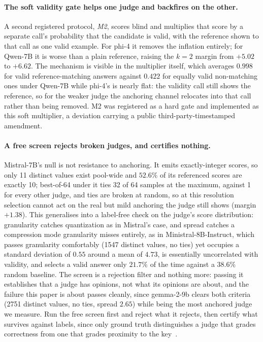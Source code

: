 \documentclass[11pt]{article}
\begin{document}
\paragraph{The soft validity gate helps one judge and backfires on the other.}
A second registered protocol, \emph{M2}, scores blind and multiplies that score by a separate call's probability that the candidate is valid, with the reference shown to that call as one valid example.
For phi-4 it removes the inflation entirely; for Qwen-7B it is worse than a plain reference, raising the $k{=}2$ margin from $+5.02$ to $+6.62$.
The mechanism is visible in the multiplier itself, which averages $0.998$ for valid reference-matching answers against $0.422$ for equally valid non-matching ones under Qwen-7B while phi-4's is nearly flat: the validity call still shows the reference, so for the weaker judge the anchoring channel relocates into that call rather than being removed.
M2 was registered as a hard gate and implemented as this soft multiplier, a deviation carrying a public third-party-timestamped amendment.

\paragraph{A free screen rejects broken judges, and certifies nothing.}
Mistral-7B's null is not resistance to anchoring.
It emits exactly-integer scores, so only 11 distinct values exist pool-wide and $52.6\%$ of its referenced scores are exactly 10; best-of-64 under it ties 32 of 64 samples at the maximum, against 1 for every other judge, and ties are broken at random, so at this resolution selection cannot act on the real but mild anchoring the judge still shows (margin $+1.38$).
This generalises into a label-free check on the judge's score distribution: granularity catches quantization as in Mistral's case, and spread catches a compression mode granularity misses entirely, as in Ministral-8B-Instruct, which passes granularity comfortably (1547 distinct values, no ties) yet occupies a standard deviation of $0.55$ around a mean of $4.73$, is essentially uncorrelated with validity, and selects a valid answer only $21.7\%$ of the time against a $38.6\%$ random baseline.
The screen is a rejection filter and nothing more: passing it establishes that a judge has opinions, not what its opinions are about, and the failure this paper is about passes cleanly, since gemma-2-9b clears both criteria (2751 distinct values, no ties, spread $2.65$) while being the most anchored judge we measure.
Run the free screen first and reject what it rejects, then certify what survives against labels, since only ground truth distinguishes a judge that grades correctness from one that grades proximity to the key~\cite{companionA}.
\end{document}
